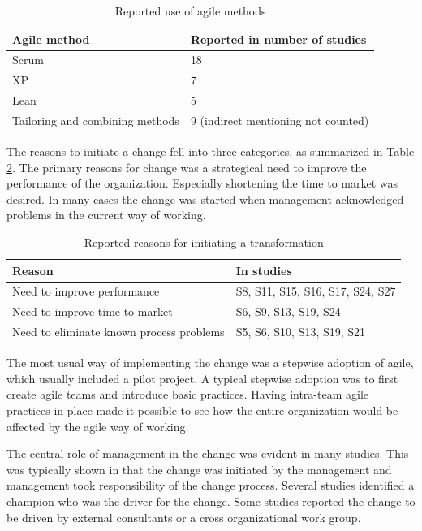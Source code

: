 \documentclass[lnbip]{svmultln}
\begin{document}
\begin{table}[t]
    \begin{tabular}{ l@{ \hskip 0.4cm } l }
        \toprule
        Agile method    & Reported in number of studies   \\ \midrule
        Scrum           & 18 \\ 
        XP              & 7 \\
        Lean            & 5 \\
        Tailoring and combining methods & 9  (indirect mentioning not counted) \\
        \bottomrule
    \end{tabular}
    \caption{Reported use of agile methods}
    \label{table:methods}
\end{table}


The reasons to initiate a change fell into three categories, as summarized in
Table \ref{table:motivations}. The primary reasons for change was a strategical
need to improve the performance of the organization. Especially shortening the
time to market was desired. In many cases the change was started when management
acknowledged problems in the current way of working.

\begin{table}[t]
    \begin{tabular}{ l@{ \hskip 0.4cm } l }
        \toprule
        Reason                                    & In studies   \\ \midrule
        Need to improve performance               & S8, S11, S15, S16, S17, S24, S27 \\ 
        Need to improve time to market            & S6, S9, S13, S19, S24 \\
        Need to eliminate known process problems  & S5, S6, S10, S13, S19, S21 \\
        \bottomrule
    \end{tabular}
    \caption{Reported reasons for initiating a transformation}
    \label{table:motivations}
\end{table}


The most usual way of implementing the change was a stepwise adoption of agile,
which usually included a pilot project. A typical stepwise adoption was to first
create agile teams and introduce basic practices. Having intra-team agile
practices in place made it possible to see how the entire organization would be
affected by the agile way of working.

The central role of management in the change was evident in many studies. This
was typically shown in that the change was initiated by the management and
management took responsibility of the change process. Several studies identified
a champion who was the driver for the change. Some studies reported the change to
be driven by external consultants or a cross organizational work group.
\end{document}
